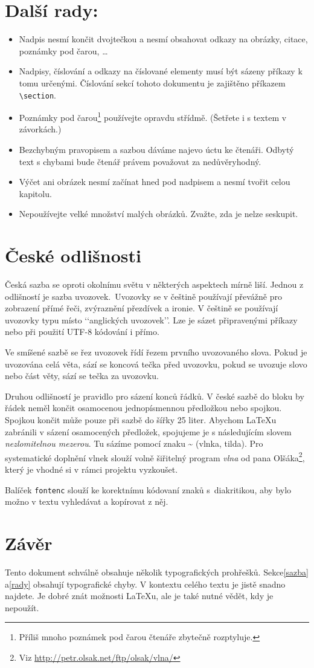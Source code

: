 \documentclass[a4paper, 10pt, twocolumn]{article}
\begin{document}
\section{\label{rady}Další rady:}
\begin{itemize}
    \item Nadpis nesmí končit dvojtečkou a nesmí obsahovat odkazy na obrázky, citace, poznámky pod čarou, \dots
    \item Nadpisy, číslování a odkazy na číslované elementy musí být sázeny příkazy k tomu určenými. Číslování sekcí tohoto dokumentu je zajištěno příkazem \verb|\section|.
    \item Poznámky pod čarou\footnote[1]{Příliš mnoho poznámek pod čarou čtenáře zbytečně rozptyluje.} používejte opravdu střídmě. (Šetřete i s textem v závorkách.)
    \item Bezchybným pravopisem a sazbou dáváme najevo úctu ke čtenáři. Odbytý text s chybami bude čtenář právem považovat za nedůvěryhodný.
    \item Výčet ani obrázek nesmí začínat hned pod nadpisem a nesmí tvořit celou kapitolu.
    \item Nepoužívejte velké množství malých obrázků. Zvažte, zda je nelze seskupit.
\end{itemize}
\section{České odlišnosti}
Česká sazba se oproti okolnímu světu v některých aspektech mírně liší. Jednou z odlišností je sazba uvozovek.~Uvozovky se v češtině používají převážně pro 
zobrazení přímé řeči, zvýraznění přezdívek a ironie. V češtině se \mbox{používají} uvozovky typu  místo ‘‘anglických uvozovek’’.
Lze je sázet připravenými příkazy nebo při použití UTF-8 kódování i přímo.
\par
Ve smíšené sazbě se řez uvozovek řídí řezem prvního uvozovaného slova.
Pokud je uvozována celá věta, sází se koncová tečka před uvozovku, pokud se uvozuje slovo nebo část věty, sází se tečka za uvozovku.
\par
Druhou odlišností je pravidlo pro sázení konců řádků.
V české sazbě do bloku by řádek neměl končit osamocenou jednopísmennou předložkou nebo spojkou.
Spojkou  končit může pouze při sazbě do šířky 25 liter.
Abychom \LaTeX u zabránili v sázení osamocených předložek, spojujeme je s následujícím slovem \textit{nezlomitelnou mezerou}.
Tu sázíme pomocí znaku \~{} (vlnka, tilda).
Pro systematické doplnění vlnek slouží volně šiřitelný program \textit{vlna} od pana Olšáka\footnote[2]{ Viz \href{http://petr.olsak.net/ftp/olsak/vlna/}{http://petr.olsak.net/ftp/olsak/vlna/}}, který je vhodné si v rámci projektu vyzkoušet.
\par
Balíček \texttt{fontenc} slouží ke korektnímu kódovaní znaků s~diakritikou, aby bylo možno v textu vyhledávat a kopírovat z něj.


\section{Závěr}
Tento dokument schválně obsahuje několik typografických prohřešků.
Sekce\ref{sazba} a\ref{rady}  obsahují typografické chyby.
V kontextu celého textu je jistě snadno najdete.
Je dobré znát možnosti \LaTeX u, ale je také nutné vědět, kdy je nepoužít.
\end{document}
